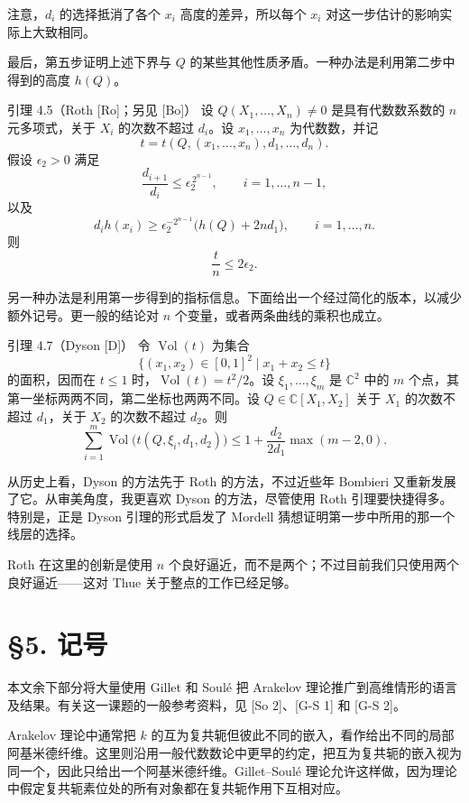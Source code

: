 注意，$d_i$ 的选择抵消了各个 $x_i$ 高度的差异，所以每个 $x_i$ 对这一步估计的影响实际上大致相同。

最后，第五步证明上述下界与 $Q$ 的某些其他性质矛盾。一种办法是利用第二步中得到的高度 $h(Q)$。
\begin{statement}{引理 4.5（Roth [Ro]；另见 [Bo]）}
设 $Q(X_1,\ldots,X_n)\ne0$ 是具有代数数系数的 $n$ 元多项式，关于 $X_i$ 的次数不超过 $d_i$。设 $x_1,\ldots,x_n$ 为代数数，并记
\[
t=t(Q,(x_1,\ldots,x_n),d_1,\ldots,d_n).
\]
假设 $\epsilon_2>0$ 满足
\[
\frac{d_{i+1}}{d_i}\le\epsilon_2^{\,2^{n-1}},\qquad i=1,\ldots,n-1,
\]
以及
\begin{equation*}
d_i h(x_i)\ge\epsilon_2^{-2^{n-1}}\bigl(h(Q)+2nd_1\bigr),
\qquad i=1,\ldots,n.\tag{4.6}
\end{equation*}
则
\[
\frac tn\le2\epsilon_2.
\]
\end{statement}

另一种办法是利用第一步得到的指标信息。下面给出一个经过简化的版本，以减少额外记号。更一般的结论对 $n$ 个变量，或者两条曲线的乘积也成立。
\begin{statement}{引理 4.7（Dyson [D]）}
令 $\operatorname{Vol}(t)$ 为集合
\[
\{(x_1,x_2)\in[0,1]^2\mid x_1+x_2\le t\}
\]
的面积，因而在 $t\le1$ 时，$\operatorname{Vol}(t)=t^2/2$。设 $\xi_1,\ldots,\xi_m$ 是 $\mathbb C^2$ 中的 $m$ 个点，其第一坐标两两不同，第二坐标也两两不同。设 $Q\in\mathbb C[X_1,X_2]$ 关于 $X_1$ 的次数不超过 $d_1$，关于 $X_2$ 的次数不超过 $d_2$。则
\[
\sum_{i=1}^m\operatorname{Vol}\bigl(t(Q,\xi_i,d_1,d_2)\bigr)
\le1+\frac{d_2}{2d_1}\max(m-2,0).
\]
\end{statement}
从历史上看，Dyson 的方法先于 Roth 的方法，不过近些年 Bombieri 又重新发展了它。从审美角度，我更喜欢 Dyson 的方法，尽管使用 Roth 引理要快捷得多。特别是，正是 Dyson 引理的形式启发了 Mordell 猜想证明第一步中所用的那一个线层的选择。

Roth 在这里的创新是使用 $n$ 个良好逼近，而不是两个；不过目前我们只使用两个良好逼近——这对 Thue 关于整点的工作已经足够。

\section*{§5. 记号}
本文余下部分将大量使用 Gillet 和 Soulé 把 Arakelov 理论推广到高维情形的语言及结果。有关这一课题的一般参考资料，见 [So 2]、[G-S 1] 和 [G-S 2]。

Arakelov 理论中通常把 $k$ 的互为复共轭但彼此不同的嵌入，看作给出不同的局部阿基米德纤维。这里则沿用一般代数数论中更早的约定，把互为复共轭的嵌入视为同一个，因此只给出一个阿基米德纤维。Gillet--Soulé 理论允许这样做，因为理论中假定复共轭素位处的所有对象都在复共轭作用下互相对应。


